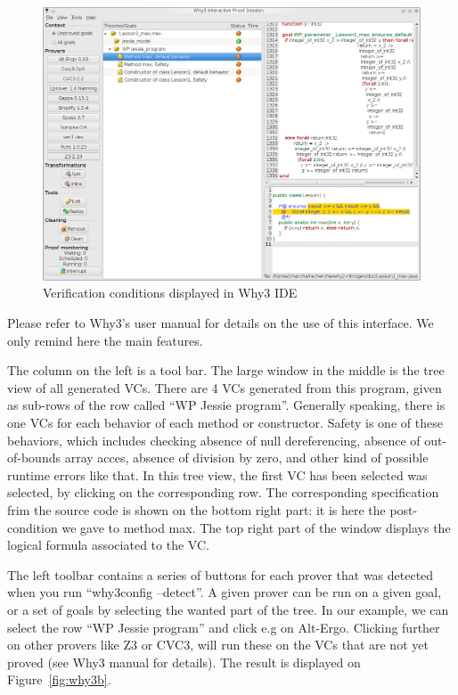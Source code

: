 \documentclass[a4paper,11pt,twoside,openright]{report}
\begin{document}
\begin{figure}[t]
  \begin{center}
    \hspace*{-0.1\textwidth}
    \includegraphics[width=1.2\textwidth]{Lesson1_max_why3_1.png}
  \end{center}
  \caption{Verification conditions displayed in Why3 IDE}
\label{fig:gwhy}
\hrulefill
\end{figure}

  Please refer to Why3's user manual for details on the use of this
  interface. We only remind here the main features.

  The column on the left is a tool bar.  The large window in the
  middle is the tree view of all generated VCs. There are 4 VCs
  generated from this program, given as sub-rows of the row called
  ``WP Jessie program''. Generally speaking, there is one VCs for each
  behavior of each method or constructor. Safety is one of these
  behaviors, which includes checking absence of null dereferencing,
  absence of out-of-bounds array acces, absence of division by zero,
  and other kind of possible runtime errors like that.  In this tree
  view, the first VC has been selected was selected, by clicking on
  the corresponding row. The corresponding specification frim the
  source code is shown on the bottom right part: it is here the
  post-condition we gave to method max. The top right part of the
  window displays the logical formula associated to the VC.

  The left toolbar contains a series of buttons for each prover that
  was detected when you run ``why3config --detect''. A given prover
  can be run on a given goal, or a set of goals by selecting the
  wanted part of the tree. In our example, we can select the row ``WP
  Jessie program'' and click e.g on Alt-Ergo. Clicking further on
  other provers like Z3 or CVC3, will run these on the VCs that are
  not yet proved (see Why3 manual for details). The result is
  displayed on Figure~\ref{fig:why3b}.
\end{document}
